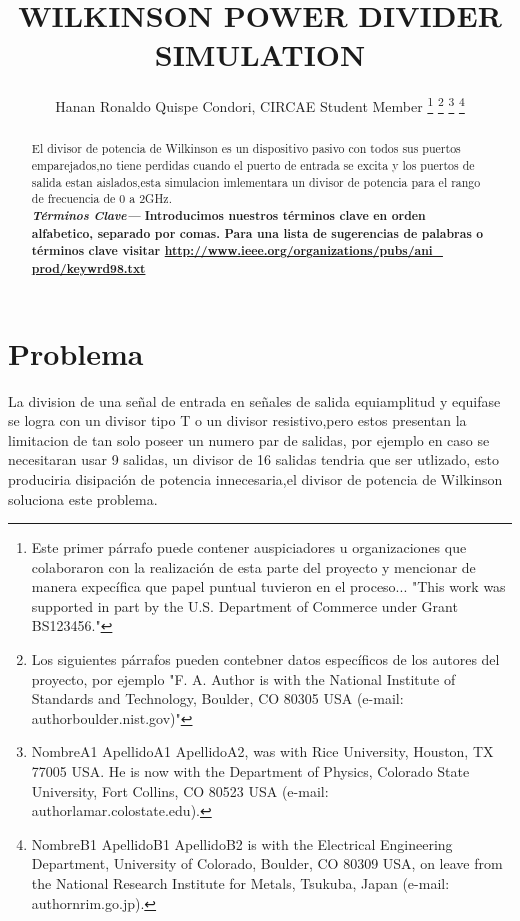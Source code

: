 \documentclass[a4paper]{IEEEtran} %
\providecommand{\keywords}[1]{\textbf{\textit{Términos Clave---}} #1}
\begin{document}
\title{WILKINSON POWER DIVIDER SIMULATION}
\author{Hanan Ronaldo Quispe Condori, CIRCAE Student Member
\thanks{Este primer párrafo puede contener auspiciadores u organizaciones que colaboraron con la realización de esta parte del proyecto y mencionar de manera expecífica que papel puntual tuvieron en el proceso... "This work was supported in part by the U.S. Department of Commerce under Grant BS123456."}
\thanks{Los siguientes párrafos pueden contebner datos específicos de los autores del proyecto, por ejemplo "F. A. Author is with the National Institute of Standards and Technology, Boulder, CO 80305 USA (e-mail: author\@ boulder.nist.gov)"}
\thanks{NombreA1 ApellidoA1 ApellidoA2, was with Rice University, Houston, TX 77005 USA. He is now with the Department of Physics, Colorado State University, Fort Collins, CO 80523 USA (e-mail: author\@ lamar.colostate.edu).}
\thanks{NombreB1 ApellidoB1 ApellidoB2 is with the Electrical Engineering Department, University of Colorado, Boulder, CO 80309 USA, on leave from the National Research Institute for Metals, Tsukuba, Japan (e-mail: author\@ nrim.go.jp).}}

\maketitle


\begin{abstract}
El divisor de potencia de Wilkinson es un dispositivo pasivo con todos sus puertos emparejados,no tiene perdidas cuando el puerto de entrada se excita y los puertos de salida estan aislados,esta simulacion imlementara un divisor de potencia para el rango de frecuencia de 0 a 2GHz.\\
\keywords{\textbf{Introducimos nuestros términos clave en orden alfabetico, separado por comas. Para una lista de sugerencias de palabras o términos clave visitar \underline{http://www.ieee.org/organizations/pubs/ani\_ prod/keywrd98.txt}}}
\end{abstract}
\section{Problema}
La division de una señal de entrada en señales de salida equiamplitud y equifase se logra con un divisor tipo T o un divisor resistivo,pero estos presentan la limitacion de tan solo poseer un numero par de salidas, por ejemplo en caso se necesitaran usar 9 salidas, un divisor de 16 salidas tendria que ser utlizado, esto produciria disipación de potencia innecesaria,el divisor de potencia de Wilkinson soluciona este problema.\\ 
\end{document}
